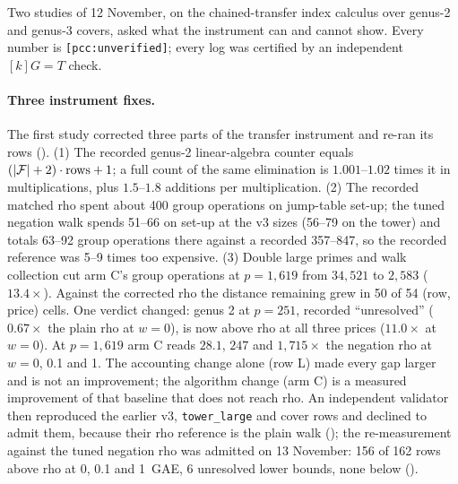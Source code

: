 Two studies of 12 November, on the chained-transfer index calculus over
genus-2 and genus-3 covers, asked what the instrument can and cannot show.
Every number is \texttt{[pcc:unverified]}; every log was certified by an
independent $[k]G=T$ check.

\paragraph{Three instrument fixes.} The first study corrected three parts
of the transfer instrument and re-ran its rows
(). (1) The recorded
genus-2 linear-algebra counter equals $(\lvert \mathcal{F} \rvert+2)\cdot\text{rows}+1$; a full
count of the same elimination is $1.001$--$1.02$ times it in
multiplications, plus $1.5$--$1.8$ additions per multiplication. (2) The
recorded matched rho spent about 400 group operations on jump-table set-up;
the tuned negation walk spends 51--66 on set-up at the v3 sizes (56--79 on
the tower) and totals 63--92 group operations there against a recorded
357--847, so the recorded reference was 5--9 times too expensive. (3) Double large primes and walk
collection cut arm C's group operations at $p=1{,}619$ from $34{,}521$ to
$2{,}583$ ($13.4\times$). Against the corrected rho the distance remaining
grew in 50 of 54 (row, price) cells. One verdict changed: genus 2 at
$p=251$, recorded ``unresolved'' ($0.67\times$ the plain rho at $w=0$), is now
above rho at all three prices ($11.0\times$ at $w=0$). At $p=1{,}619$ arm C
reads $28.1$, $247$ and $1{,}715\times$ the negation rho at $w=0$, 0.1 and 1.
The accounting change alone (row L) made every gap larger and is not an
improvement; the algorithm change (arm C) is a measured improvement of that
baseline that does not reach rho. An independent validator then reproduced
the earlier v3, \texttt{tower\_large} and cover rows and declined to admit
them, because their rho reference is the plain walk
(); the re-measurement against
the tuned negation rho was admitted on 13 November: 156 of 162 rows above
rho at 0, 0.1 and 1~GAE, 6 unresolved lower bounds, none below
().

